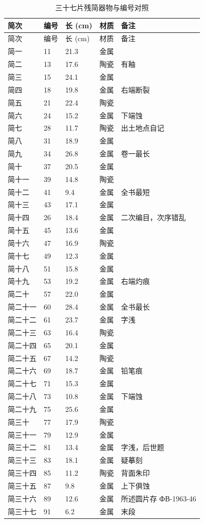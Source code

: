 \begingroup
\footnotesize
\linespread{1.2}\selectfont
\begin{longtable}{@{}p{30mm}p{22mm}p{16mm}p{26mm}p{28mm}@{}}
\caption{三十七片残简器物与编号对照}\\
\toprule
简次 & 编号 & 长 (cm) & 材质 & 备注\\
\midrule
\endfirsthead
\toprule
简次 & 编号 & 长 (cm) & 材质 & 备注\\
\midrule
\endhead
简一 & 11 & 21.3 & 金属 & \\
简二 & 13 & 17.6 & 陶瓷 & 有釉\\
简三 & 15 & 24.1 & 金属 & \\
简四 & 18 & 19.8 & 金属 & 右端断裂\\
简五 & 21 & 22.4 & 陶瓷 & \\
简六 & 24 & 15.2 & 金属 & 下端蚀\\
简七 & 28 & 11.7 & 陶瓷 & 出土地点自记\\
简八 & 31 & 18.9 & 金属 & \\
简九 & 34 & 26.8 & 金属 & 卷一最长\\
简十 & 37 & 20.5 & 金属 & \\
简十一 & 39 & 14.8 & 陶瓷 & \\
简十二 & 41 & 9.4 & 金属 & 全书最短\\
简十三 & 43 & 17.1 & 金属 & \\
简十四 & 26 & 18.4 & 金属 & 二次编目，次序错乱\\
简十五 & 45 & 13.6 & 金属 & \\
简十六 & 47 & 16.9 & 陶瓷 & \\
简十七 & 49 & 12.3 & 金属 & \\
简十八 & 51 & 15.8 & 金属 & \\
简十九 & 53 & 19.2 & 金属 & 右端灼痕\\
简二十 & 57 & 22.0 & 金属 & \\
简二十一 & 60 & 28.4 & 金属 & 全书最长\\
简二十二 & 61 & 23.7 & 金属 & 字浅\\
简二十三 & 63 & 16.4 & 陶瓷 & \\
简二十四 & 65 & 20.1 & 金属 & \\
简二十五 & 67 & 14.2 & 陶瓷 & \\
简二十六 & 69 & 18.7 & 金属 & 铅笔痕\\
简二十七 & 71 & 15.3 & 金属 & \\
简二十八 & 73 & 10.8 & 金属 & 下端蚀\\
简二十九 & 75 & 25.6 & 金属 & \\
简三十 & 77 & 17.9 & 陶瓷 & \\
简三十一 & 79 & 12.9 & 金属 & \\
简三十二 & 81 & 13.4 & 金属 & 字浅，后世题\\
简三十三 & 83 & 18.1 & 金属 & 疑摹刻\\
简三十四 & 85 & 11.2 & 陶瓷 & 背面朱印\\
简三十五 & 87 & 9.8 & 金属 & 上下俱蚀\\
简三十六 & 89 & 12.6 & 金属 & 所述圆片存 ФВ-1963-46\\
简三十七 & 91 & 6.2 & 金属 & 末段\\
\bottomrule
\end{longtable}
\endgroup

